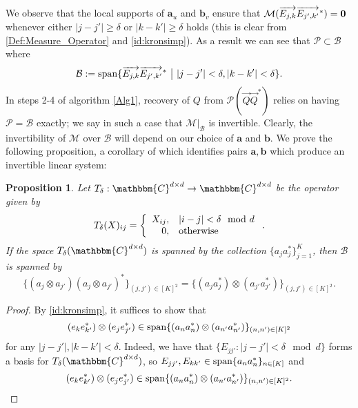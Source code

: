 \documentclass[]{spie}  %
\newtheorem{prop}{Proposition}
\def \vec{\overrightarrow}
\def \a {\mathbf a}
\def \b {\mathbf b}
\def \C {\mathbbm{C}}
\def \M {\mathcal{M}}
\def \P {\mathcal{P}}
\def \B {\mathcal{B}}
\def \Span {{\rm span}}
\begin{document}
We observe that the local supports of $\a_u$ and $\b_v$ ensure that $\mathcal{M}( \vec{E_{j,k}} \vec{E_{j',k'}}^*) = {\bf 0}$ whenever either $|j - j'| \geq \delta$ or $|k - k'| \geq \delta$ holds (this is clear from \eqref{Def:Measure_Operator} and \eqref{id:kronsimp}).  As a result we can see that $\P \subset \B$ where \begin{equation} \B := \Span\{ \vec{E_{j,k}} \vec{E_{j',k'}}^* ~{\bf \big |}~  |j - j'| < \delta, |k - k'| < \delta \}.\end{equation}  %
In steps 2-4 of algorithm \ref{Alg1}, recovery of $Q$ from $\P(\vec{Q} \vec{Q}^*)$ relies on having $\P = \B$ exactly; we say in such a case that $\M|_\B$ is invertible.  Clearly, the invertibility of $\M$ over $\B$ will depend on our choice of $\a$ and $\b$.  We prove the following proposition, a corollary of which identifies pairs $\a, \b$ which produce an invertible linear system:
\begin{prop}
  Let $T_\delta : \C^{d \times d} \to \C^{d \times d}$ be the operator given by $$T_\delta(X)_{ij} = \left\{\begin{array}{r@{,\quad}l}
  X_{ij} & |i - j| < \delta \mod d \\
  0 & \text{otherwise}\end{array}\right..$$
  If the space $T_{\delta}(\C^{d \times d})$ is spanned by the collection $\{a_j a_j^*\}_{j=1}^K$, then $\B$ is spanned by $$\{(a_j \otimes a_{j'}) (a_j \otimes a_{j'})^*\}_{(j, j') \in [K]^2} = \{(a_j a_j^*) \otimes (a_{j'} a_{j'}^*)\}_{(j, j') \in [K]^2}.$$
  \label{prop:kronspan}
\end{prop}

\begin{proof}
  By \eqref{id:kronsimp}, it suffices to show that $$(e_k e_{k'}^*) \otimes (e_j e_{j'}^*) \in \Span\{(a_n a_n^*) \otimes (a_{n'} a_{n'}^*)\}_{(n, n') \in [K]^2}$$ for any $|j - j'|, |k - k'| < \delta$.  Indeed, we have that $\{E_{jj'} : |j - j'| < \delta \mod d\}$ forms a basis for $T_\delta(\C^{d \times d})$, so $E_{j j'}, E_{k k'} \in \Span\{a_n a_n^*\}_{n \in [K]}$ and $$(e_k e_{k'}^*) \otimes (e_j e_{j'}^*) \in \Span\{(a_n a_n^*) \otimes (a_{n'} a_{n'}^*)\}_{(n, n') \in [K]^2}.$$
\end{proof}
\end{document}
